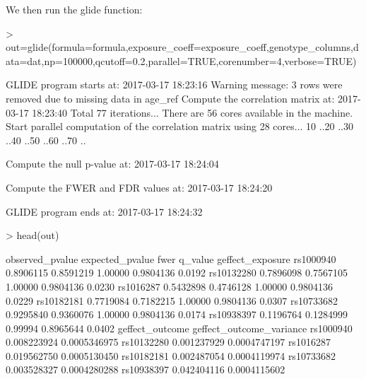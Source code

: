 \documentclass[12pt]{article}
\begin{document}
We then run the glide function:
\begin{Schunk}
\begin{Sinput}
> out=glide(formula=formula,exposure_coeff=exposure_coeff,genotype_columns,data=dat,np=100000,qcutoff=0.2,parallel=TRUE,corenumber=4,verbose=TRUE)
\end{Sinput}
\begin{Soutput}
GLIDE program starts at: 2017-03-17 18:23:16
Warning message: 3 rows were removed due to missing data in age_ref
Compute the correlation matrix at: 2017-03-17 18:23:40
Total 77 iterations... 
There are 56 cores available in the machine.
Start parallel computation of the correlation matrix using 28 cores...
10 ..20 ..30 ..40 ..50 ..60 ..70 ..

Compute the null p-value at: 2017-03-17 18:24:04

Compute the FWER and FDR values at: 2017-03-17 18:24:20

GLIDE program ends at: 2017-03-17 18:24:32
\end{Soutput}
\begin{Sinput}
> head(out)
\end{Sinput}
\begin{Soutput}
           observed_pvalue expected_pvalue    fwer   q_value geffect_exposure
rs1000940        0.8906115       0.8591219 1.00000 0.9804136           0.0192
rs10132280       0.7896098       0.7567105 1.00000 0.9804136           0.0230
rs1016287        0.5432898       0.4746128 1.00000 0.9804136           0.0229
rs10182181       0.7719084       0.7182215 1.00000 0.9804136           0.0307
rs10733682       0.9295840       0.9360076 1.00000 0.9804136           0.0174
rs10938397       0.1196764       0.1284999 0.99994 0.8965644           0.0402
           geffect_outcome geffect_outcome_variance
rs1000940      0.008223924             0.0005346975
rs10132280     0.001237929             0.0004747197
rs1016287      0.019562750             0.0005130450
rs10182181     0.002487054             0.0004119974
rs10733682     0.003528327             0.0004280288
rs10938397     0.042404116             0.0004115602
\end{Soutput}
\end{Schunk}
\end{document}
